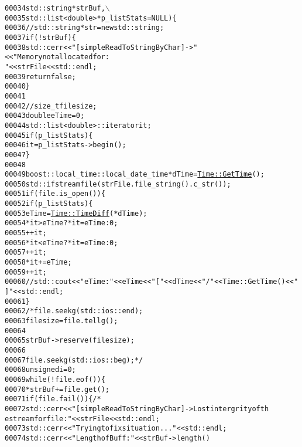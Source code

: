 \begin{footnotesize}
\begin{alltt}
00034                                          std::string *strBuf,\(\backslash\)
00035                                          std::list<double> *p\_listStats = NULL)\{
00036         \textcolor{comment}{//std::string *str = new std::string;}
00037         \textcolor{keywordflow}{if} (!strBuf)\{
00038             std::cerr<<\textcolor{stringliteral}{"[simpleReadToStringByChar]->"}<<\textcolor{stringliteral}{"Memory not allocated for:
       "}<<strFile<<std::endl;
00039             \textcolor{keywordflow}{return} \textcolor{keyword}{false};
00040         \}
00041 
00042 \textcolor{comment}{//        size\_t filesize;}
00043         \textcolor{keywordtype}{double} eTime = 0;
00044         std::list<double>::iterator it;
00045         \textcolor{keywordflow}{if}(p\_listStats)\{
00046             it = p\_listStats->begin();
00047         \}
00048 
00049         boost::local\_time::local\_date\_time *dTime = \hyperlink{group__libbuskol_ga6302b620351164dda28cc6d9d1b81aa5}{Time::GetTime}(); 
00050         std::ifstream file (strFile.file\_string().c\_str());
00051         \textcolor{keywordflow}{if} (file.is\_open())\{
00052             \textcolor{keywordflow}{if} (p\_listStats)\{
00053                 eTime = \hyperlink{group__libbuskol_gac6d1980cc97a5c78f36a3fd96ceaa573}{Time::TimeDiff}( *dTime );
00054                 *it > eTime ? *it = eTime : 0;
00055                 ++it;
00056                 *it < eTime ? *it = eTime : 0;
00057                 ++it;
00058                 *it += eTime;
00059                 ++it;
00060                 \textcolor{comment}{//std::cout<<"eTime:"<<eTime<<"["<<dTime<<"/"<<Time::GetTime()<<"
      ]"<<std::endl;}
00061             \}
00062             \textcolor{comment}{/*file.seekg(std::ios::end);}
00063 \textcolor{comment}{            filesize=file.tellg();}
00064 \textcolor{comment}{}
00065 \textcolor{comment}{            strBuf->reserve(filesize);}
00066 \textcolor{comment}{}
00067 \textcolor{comment}{            file.seekg(std::ios::beg);*/}
00068             \textcolor{keywordtype}{unsigned} i = 0; 
00069             \textcolor{keywordflow}{while} (!file.eof())\{
00070                 *strBuf  += file.get();
00071                 \textcolor{keywordflow}{if} (file.fail())\{\textcolor{comment}{/*}
00072 \textcolor{comment}{                    std::cerr<<"[simpleReadToStringByChar]->Lost intergrity of th
      e stream for file: "<<strFile<<std::endl;}
00073 \textcolor{comment}{                    std::cerr<<"Trying to fix situation..."<<std::endl;}
00074 \textcolor{comment}{                    std::cerr<<"Length of Buff: "<<strBuf->length()}

\end{alltt}
\end{footnotesize}
